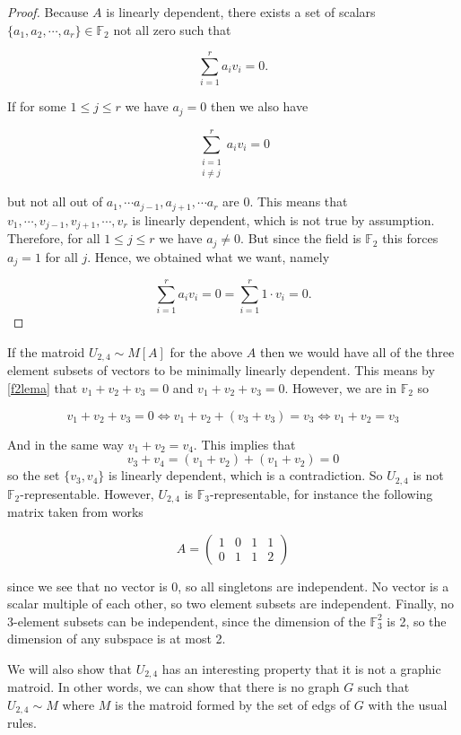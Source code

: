 \begin{proof}
    Because $A$ is linearly dependent, there exists a set of scalars $\{a_1, a_2, \cdots, a_r\}\in \mathbb{F}_2$ not all zero such that
    
    $$\sum_{i=1}^r a_iv_i = 0.$$
    
    If for some $1\leq j \leq r$ we have $a_j = 0$ then we also have 
    
    $$\sum\limits_{\substack{i = 1 \\ i \neq j}} ^r a_iv_i = 0$$

    but not all out of $a_1, \cdots a_{j-1}, a_{j+1}, \cdots a_r$ are 0. This means that ${v_1, \cdots, v_{j-1}, v_{j+1}, \cdots, v_r}$ is linearly dependent, which is not true by assumption. Therefore, for all $1\leq j \leq r$ we have $a_j \neq 0$. But since the field is $\mathbb{F}_2$ this forces $a_j = 1$ for all $j$. Hence, we obtained what we want, namely

     $$\sum_{i=1}^r a_iv_i = 0 =  \sum_{i=1}^r 1 \cdot v_i = 0.$$
    
\end{proof}

If the matroid $U_{2,4} \sim M[A]$ for the above $A$ then we would have all of the three element subsets of vectors to be minimally linearly dependent. This means by \ref{f2lema} that $v_1 + v_2 + v_3 = 0$ and $v_1 + v_2 + v_3 = 0$. However, we are in $\mathbb{F}_2$ so 


$$v_1 + v_2 + v_3 = 0 \iff v_1 + v_2 + (v_3 + v_3) = v_3 \iff v_1 + v_2 = v_3 $$

And in the same way $v_1 + v_2 = v_4$. This implies that
$$v_3 + v_4 = (v_1 + v_2 )+ (v_1 + v_2) = 0$$
so the set $\{v_3, v_4\}$ is linearly dependent, which is a contradiction. So $U_{2,4}$ is not $\mathbb{F}_2$-representable. However, $U_{2,4}$ is $\mathbb{F}_3$-representable, for instance the following matrix taken from \cite[20]{oxley1} works

$$A = \begin{pmatrix}
    1 & 0 & 1 & 1 \\
    0 & 1 & 1 & 2
\end{pmatrix}$$

since we see that no vector is 0, so all singletons are independent. No vector is a scalar multiple of each other, so two element subsets are independent. Finally, no 3-element subsets can be independent, since the dimension of the $\mathbb{F}_3^2$ is 2, so the dimension of any subspace is at most 2.

We will also show that $U_{2,4}$ has an interesting property that it is not a graphic matroid. In other words, we can show that there is no graph $G$ such that $U_{2,4} \sim M$ where $M$ is the matroid formed by the set of edgs of $G$ with the usual rules. 

